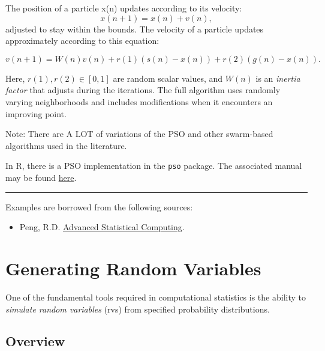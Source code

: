 \documentclass[
  letterpaper,
  DIV=11,
  numbers=noendperiod]{scrreprt}
\providecommand{\tightlist}{%
  \setlength{\itemsep}{0pt}\setlength{\parskip}{0pt}}
\begin{document}
The position of a particle x(n) updates according to its velocity:
\[x(n+1)=x(n)+v(n),\] adjusted to stay within the bounds. The velocity
of a particle updates approximately according to this equation:

\[v(n+1) = W(n)v(n)+r(1)(s(n)−x(n))+r(2)(g(n)−x(n)).\]

Here, \(r(1),r(2) \in [0,1]\) are random scalar values, and \(W(n)\) is
an \emph{inertia factor} that adjusts during the iterations. The full
algorithm uses randomly varying neighborhoods and includes modifications
when it encounters an improving point.

Note: There are A LOT of variations of the PSO and other swarm-based
algorithms used in the literature.

In R, there is a PSO implementation in the \texttt{pso} package. The
associated manual may be found
\href{https://cran.r-project.org/web/packages/pso/pso.pdf}{here}.

\begin{center}\rule{0.5\linewidth}{0.5pt}\end{center}

Examples are borrowed from the following sources:

\begin{itemize}
\tightlist
\item
  Peng, R.D. \href{https://bookdown.org/rdpeng/advstatcomp/}{Advanced
  Statistical Computing}.
\end{itemize}


\chapter{Generating Random Variables}\label{generating-random-variables}

\newcommand{\E}{\mathbb{E}}
\newcommand{\R}{\mathbb{R}}
\newcommand{\var}{\mathbb{V}ar}
\newcommand{\cov}{\mathbb{C}ov}
\newcommand{\corr}{\mathbb{C}orr}
\newcommand{\unif}{\operatorname{Unif}}
\newcommand{\geom}{\operatorname{Geom}}
\newcommand{\bet}{\operatorname{Beta}}
\newcommand{\bern}{\operatorname{Bern}}
\newcommand{\iid}{\overset{iid}{\sim}}
\newcommand{\ef}{\operatorname{Eff}}
\newcommand{\htt}{\hat{\theta}}

One of the fundamental tools required in computational statistics is the
ability to \emph{simulate random variables} (rvs) from specified
probability distributions.

\section{Overview}\label{overview}
\end{document}
